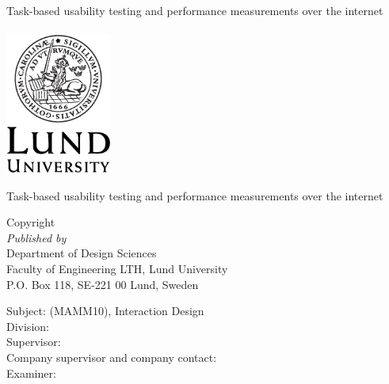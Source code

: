 \documentclass[a4paper,11pt]{article}
\newcommand\HOne{\fontsize{20}{12}\selectfont}
\begin{document}
%


\newpage

\begin{center}
  {\HOne Task-based usability testing and performance measurements over the internet} \\
  \vspace{2.5cm}
  {\Large \name} \\
  \vspace{2.0cm}
  \includegraphics[width=3.5cm]{LU-logotyp-tryck-digitalt/EPS_for_tryck/Engelska/LundUniversity_C2line_BLACK.eps}

\end{center}

\newpage


{\Large Task-based usability testing and performance measurements over the
internet}
\vspace{1.5cm} \\
\begin{large}
  Copyright \textcopyright \ \the\year \ \name \\

  \textit{Published by} \vspace{0.2cm} \\
      Department of Design Sciences \\
      Faculty of Engineering LTH, Lund University \\
      P.O. Box 118, SE-221 00 Lund, Sweden

  \vspace{0.8cm}
  Subject: (MAMM10), Interaction Design \\
  Division: \division \\
  Supervisor: \supervisor \\
  Company supervisor and company contact: \contact \\
  Examiner: \examiner \\


\end{large}
\end{document}
